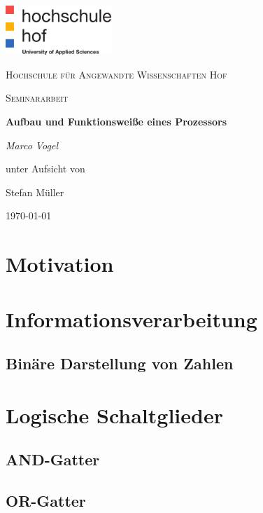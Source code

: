 \documentclass[12pt]{article}
\begin{document}
\begin{titlepage}
	\centering
	\includegraphics[width=0.3\textwidth]{logo}\par\vspace{1cm}
	{\scshape\LARGE Hochschule für Angewandte Wissenschaften Hof \par}
	\vspace{1cm}
	{\scshape\Large Seminararbeit\par}
	\vspace{1.5cm}
	{\huge\bfseries Aufbau und Funktionsweiße eines Prozessors\par}
	\vspace{2cm}
	{\Large\itshape Marco Vogel\par}
	\vfill
	unter Aufsicht von\par
	Stefan Müller

	\vfill

	{\large \today\par}
\end{titlepage}
\newpage


\tableofcontents
\newpage
\listoffigures



\section{Motivation}
\section{Informationsverarbeitung}
\subsection{Binäre Darstellung von Zahlen}

\section{Logische Schaltglieder}
\subsection{AND-Gatter}
\subsection{OR-Gatter}
\end{document}
